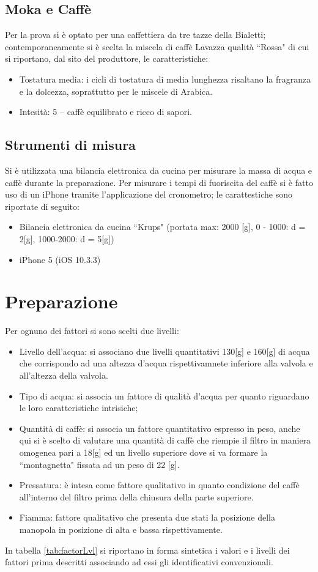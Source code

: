 \subsection{Moka e Caffè}
Per la prova si è optato per una caffettiera da tre tazze della Bialetti; contemporaneamente si è scelta la miscela di caffè Lavazza qualità “Rossa" di cui si riportano, dal sito del produttore\cite{Lavazza_2017}, le caratteristiche:
\begin{itemize}
  \item Tostatura media: i cicli di tostatura di media lunghezza risaltano la fragranza e la dolcezza, soprattutto per le miscele di Arabica.
  \item Intesità: 5 -- caffè equilibrato e ricco di sapori.
\end{itemize}
\subsection{Strumenti di misura}
Si è utilizzata una bilancia elettronica da cucina per misurare la massa di acqua e caffè durante la preparazione.
Per misurare i tempi di fuoriscita del caffè si è fatto uso di un iPhone tramite l'applicazione del cronometro; le carattestiche sono riportate di seguito:
\begin{itemize}
  \item Bilancia elettronica da cucina “Krups" (portata max: 2000 [g], 0 - 1000: d = 2[g], 1000-2000: d = 5[g])
  \item iPhone 5 (iOS 10.3.3)
\end{itemize}


\section{Preparazione}
Per ognuno dei fattori si sono scelti due livelli:
\begin{itemize}
  \item Livello dell'acqua: si associano due livelli quantitativi 130[g] e 160[g] di acqua che corrispondo ad una altezza d'acqua rispettivamnete inferiore alla valvola e all'altezza della valvola.
  \item Tipo di acqua: si associa un fattore di qualità d'acqua per quanto riguardano le loro caratteristiche intrisiche;
  \item Quantità di caffè: si associa un fattore quantitativo espresso in peso, anche qui si è scelto di valutare una quantità di caffè che riempie il filtro in maniera omogenea pari a 18[g] ed un livello superiore dove si va formare la “montagnetta" fissata ad un peso di 22 [g].
  \item Pressatura: è intesa come fattore qualitativo in quanto condizione del caffè all'interno del filtro prima della chiusura della parte superiore.
  \item Fiamma: fattore qualitativo che presenta due stati la posizione della manopola in posizione di alta e bassa rispettivamente.
\end{itemize}
In tabella \ref{tab:factorLvl} si riportano in forma sintetica i valori e i livelli dei fattori prima descritti associando ad essi gli identificativi convenzionali.

